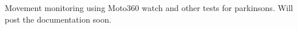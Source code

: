 Movement monitoring using Moto360 watch and other tests for parkinsons. Will post the documentation soon. 